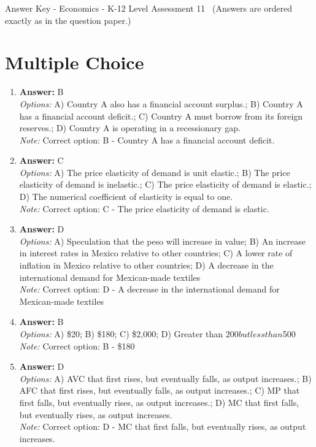 \documentclass[12pt]{article}
\begin{document}
\begin{center}
Answer Key - Economics - K-12 Level Assessment 11 \
\small (Answers are ordered exactly as in the question paper.)
\end{center}

\section*{Multiple Choice}
\begin{enumerate}[label=\arabic*.]
\item \textbf{Answer:} B
\\ \textit{Options:} A) Country A also has a financial account surplus.; B) Country A has a financial account deficit.; C) Country A must borrow from its foreign reserves.; D) Country A is operating in a recessionary gap.
\\ \textit{Note:} Correct option: B - Country A has a financial account deficit.
\item \textbf{Answer:} C
\\ \textit{Options:} A) The price elasticity of demand is unit elastic.; B) The price elasticity of demand is inelastic.; C) The price elasticity of demand is elastic.; D) The numerical coefficient of elasticity is equal to one.
\\ \textit{Note:} Correct option: C - The price elasticity of demand is elastic.
\item \textbf{Answer:} D
\\ \textit{Options:} A) Speculation that the peso will increase in value; B) An increase in interest rates in Mexico relative to other countries; C) A lower rate of inflation in Mexico relative to other countries; D) A decrease in the international demand for Mexican-made textiles
\\ \textit{Note:} Correct option: D - A decrease in the international demand for Mexican-made textiles
\item \textbf{Answer:} B
\\ \textit{Options:} A) \$20; B) \$180; C) \$2,000; D) Greater than $200 but less than $500
\\ \textit{Note:} Correct option: B - \$180
\item \textbf{Answer:} D
\\ \textit{Options:} A) AVC that first rises, but eventually falls, as output increases.; B) AFC that first rises, but eventually falls, as output increases.; C) MP that first falls, but eventually rises, as output increases.; D) MC that first falls, but eventually rises, as output increases.
\\ \textit{Note:} Correct option: D - MC that first falls, but eventually rises, as output increases.
\end{enumerate}
\end{document}
